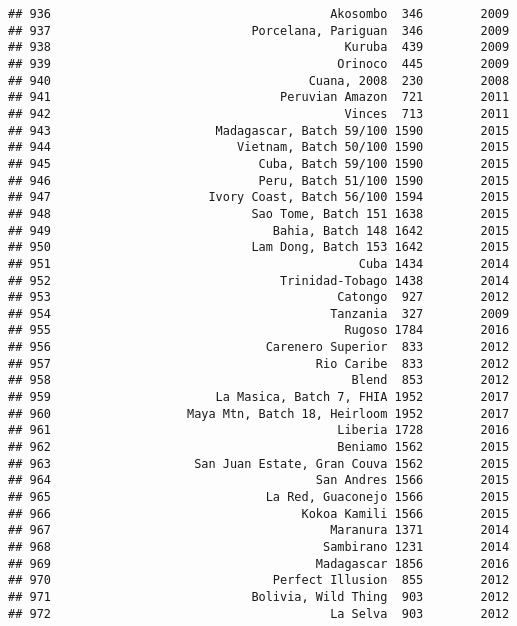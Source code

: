 \documentclass[
]{article}
\begin{document}
\begin{verbatim}
## 936                                       Akosombo  346        2009
## 937                            Porcelana, Pariguan  346        2009
## 938                                         Kuruba  439        2009
## 939                                        Orinoco  445        2009
## 940                                    Cuana, 2008  230        2008
## 941                                Peruvian Amazon  721        2011
## 942                                         Vinces  713        2011
## 943                       Madagascar, Batch 59/100 1590        2015
## 944                          Vietnam, Batch 50/100 1590        2015
## 945                             Cuba, Batch 59/100 1590        2015
## 946                             Peru, Batch 51/100 1590        2015
## 947                      Ivory Coast, Batch 56/100 1594        2015
## 948                            Sao Tome, Batch 151 1638        2015
## 949                               Bahia, Batch 148 1642        2015
## 950                            Lam Dong, Batch 153 1642        2015
## 951                                           Cuba 1434        2014
## 952                                Trinidad-Tobago 1438        2014
## 953                                        Catongo  927        2012
## 954                                       Tanzania  327        2009
## 955                                         Rugoso 1784        2016
## 956                              Carenero Superior  833        2012
## 957                                     Rio Caribe  833        2012
## 958                                          Blend  853        2012
## 959                       La Masica, Batch 7, FHIA 1952        2017
## 960                   Maya Mtn, Batch 18, Heirloom 1952        2017
## 961                                        Liberia 1728        2016
## 962                                        Beniamo 1562        2015
## 963                    San Juan Estate, Gran Couva 1562        2015
## 964                                     San Andres 1566        2015
## 965                              La Red, Guaconejo 1566        2015
## 966                                   Kokoa Kamili 1566        2015
## 967                                       Maranura 1371        2014
## 968                                      Sambirano 1231        2014
## 969                                     Madagascar 1856        2016
## 970                               Perfect Illusion  855        2012
## 971                            Bolivia, Wild Thing  903        2012
## 972                                       La Selva  903        2012

\end{verbatim}
\end{document}
